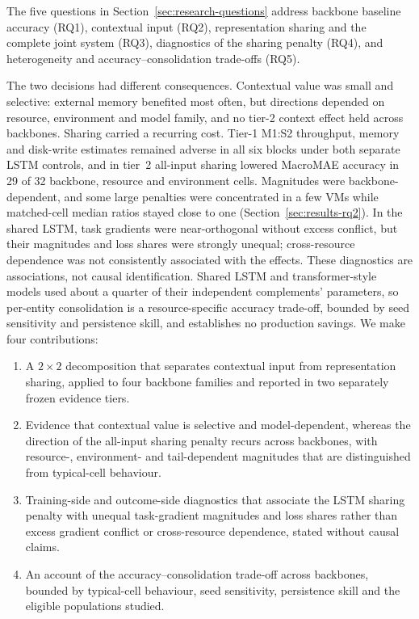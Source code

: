 \documentclass[5p,twocolumn]{elsarticle}
\begin{document}
The five questions in Section~\ref{sec:research-questions} address backbone
baseline accuracy (RQ1), contextual input (RQ2), representation sharing and
the complete joint system (RQ3), diagnostics of the sharing penalty (RQ4), and
heterogeneity and accuracy--consolidation trade-offs (RQ5).

The two decisions had different consequences. Contextual value was small
and selective: external memory benefited most often, but directions depended
on resource, environment and model family, and no tier-2 context effect held
across backbones. Sharing carried a recurring cost. Tier-1 M1:S2 throughput,
memory and disk-write estimates remained adverse in all six blocks under both
separate LSTM controls, and in tier~2 all-input sharing lowered MacroMAE
accuracy in 29 of 32 backbone, resource and environment cells. Magnitudes
were backbone-dependent, and some large penalties were concentrated in a few
VMs while matched-cell median ratios stayed close to one
(Section~\ref{sec:results-rq2}). In the shared LSTM, task gradients were
near-orthogonal without excess conflict, but their magnitudes and loss
shares were strongly unequal; cross-resource dependence was not
consistently associated with the effects. These diagnostics are associations, not causal identification.
Shared LSTM and transformer-style models used about a quarter of their
independent complements' parameters, so per-entity consolidation is a
resource-specific accuracy trade-off, bounded by seed sensitivity and
persistence skill, and establishes no production savings. We make four
contributions:

\begin{enumerate}
  \item A $2\times2$ decomposition that separates contextual input from
    representation sharing, applied to four backbone families and
    reported in two separately frozen evidence tiers.
  \item Evidence that contextual value is selective and model-dependent,
    whereas the direction of the all-input sharing penalty recurs across
    backbones, with resource-, environment- and tail-dependent magnitudes
    that are distinguished from typical-cell behaviour.
  \item Training-side and outcome-side diagnostics that associate the
    LSTM sharing penalty with unequal task-gradient magnitudes and loss
    shares rather than excess gradient conflict or cross-resource
    dependence, stated without causal claims.
  \item An account of the accuracy--consolidation trade-off across
    backbones, bounded by typical-cell behaviour, seed sensitivity,
    persistence skill and the eligible populations studied.
\end{enumerate}
\end{document}
